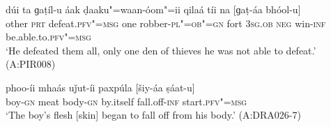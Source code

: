 \begin{exe}
\ex
\label{ex:9-77}
\gll dúi ta ɡaṭíl-u áak ḍaaku"=waan-óom"=ii qilaá tíi na [ɡaṭ-áa bhóol-u]  \\
other \textsc{prt} defeat.\textsc{pfv"=msg} one robber-\textsc{pl"=ob"=gn}  fort \textsc{3sg.ob} \textsc{neg} win-\textsc{inf} be.able.to.\textsc{pfv"=msg} \\
\glt `He defeated them all, only one den of thieves he was not able to defeat.' (A:PIR008)

\ex
\label{ex:9-78}
\gll phoo-íi mhaás uǰut-íi paxpúla [šiy-áa ṣáat-u] \\
boy-\textsc{gn} meat body-\textsc{gn} by.itself fall.off-\textsc{inf} start.\textsc{pfv"=msg} \\
\glt `The boy's flesh [skin] began to fall off from his body.' (A:DRA026-7) 
\end{exe}